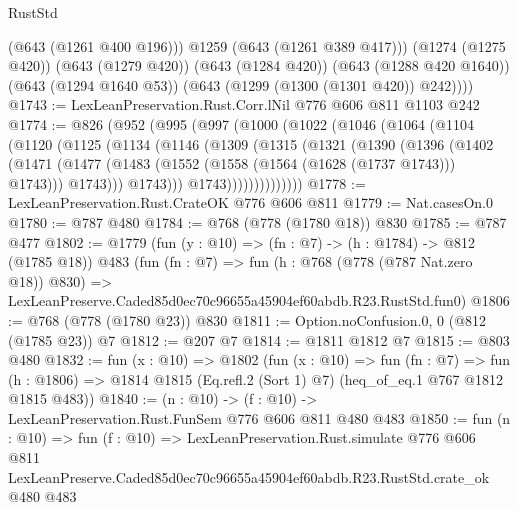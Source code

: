 \begin{lexlean}{RustStd}
\begin{coremodule}
            (@643 (@1261 @400 @196)))
          @1259
          (@643 (@1261 @389 @417)))
        (@1274 (@1275 @420))
        (@643 (@1279 @420))
        (@643 (@1284 @420))
        (@643 (@1288 @420 @1640))
        (@643 (@1294 @1640 @53))
        (@643 (@1299 (@1300 (@1301 @420)) @242))))
@1743 := LexLeanPreservation.Rust.Corr.lNil @776 @606 @811 @1103 @242
@1774 := @826
    (@952
      (@995
        (@997
          (@1000
            (@1022
              (@1046
                (@1064
                  (@1104
                    (@1120
                      (@1125
                        (@1134
                          (@1146
                            (@1309
                              (@1315
                                (@1321
                                  (@1390
                                    (@1396
                                      (@1402
                                        (@1471
                                          (@1477
                                            (@1483
                                              (@1552 (@1558 (@1564 (@1628 (@1737 @1743))) @1743)))
                                            @1743)))
                                      @1743)))
                                @1743))))))))))))))
@1778 := LexLeanPreservation.Rust.CrateOK @776 @606 @811
@1779 := Nat.casesOn.{0}
@1780 := @787 @480
@1784 := @768 (@778 (@1780 @18)) @830
@1785 := @787 @477
@1802 := @1779
    (fun (y : @10) => (fn : @7) -> (h : @1784) -> @812 (@1785 @18))
    @483
    (fun (fn : @7) =>
    fun (h : @768 (@778 (@787 Nat.zero @18)) @830) =>
    LexLeanPreserve.Caded85d0ec70c96655a45904ef60abdb.R23.RustStd.fun0)
@1806 := @768 (@778 (@1780 @23)) @830
@1811 := Option.noConfusion.{0, 0} (@812 (@1785 @23)) @7
@1812 := @207 @7
@1814 := @1811 @1812 @7
@1815 := @803 @480
@1832 := fun (x : @10) =>
  @1802
    (fun (x : @10) =>
    fun (fn : @7) =>
    fun (h : @1806) => @1814 @1815 (Eq.refl.{2} (Sort 1) @7) (heq_of_eq.{1} @767 @1812 @1815 @483))
@1840 := (n : @10) -> (f : @10) -> LexLeanPreservation.Rust.FunSem @776 @606 @811 @480 @483
@1850 := fun (n : @10) =>
  fun (f : @10) =>
  LexLeanPreservation.Rust.simulate
    @776
    @606
    @811
    LexLeanPreserve.Caded85d0ec70c96655a45904ef60abdb.R23.RustStd.crate_ok
    @480
    @483
\end{coremodule}
\end{lexlean}
